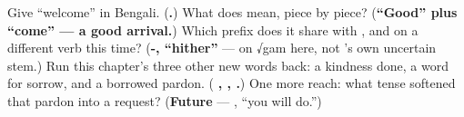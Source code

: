 \begin{tcolorbox}[breakable,colback=teal!4,colframe=teal!35!black,title={Before you move on}]
Give \textquotedblleft{}welcome\textquotedblright{} in Bengali. (\textbf{.}) What does  mean, piece by piece? (\textbf{\textquotedblleft{}Good\textquotedblright{} plus \textquotedblleft{}come\textquotedblright{} — a good arrival.}) Which prefix does it share with , and on a different verb this time? (\textbf{-, \textquotedblleft{}hither\textquotedblright{}} — on √gam here, not 's own uncertain stem.) Run this chapter's three other new words back: a kindness done, a word for sorrow, and a borrowed pardon. (\textbf{ , ,  .}) One more reach: what tense softened that pardon into a request? (\textbf{Future} — , \textquotedblleft{}you will do.\textquotedblright{})
\end{tcolorbox}
